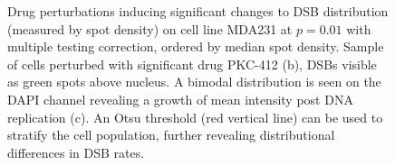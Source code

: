 \begin{figure}[h!]%
    \centering
    \qquad
    \qquad
  \caption{Drug perturbations inducing significant changes to DSB distribution (measured by spot density) on cell line MDA231 at $p = 0.01$ with multiple testing correction, ordered by median spot density. Sample of cells perturbed with significant drug PKC-412 (b), DSBs visible as green spots above nucleus. A bimodal distribution is seen on the DAPI channel revealing a growth of mean intensity post DNA replication (c). An Otsu threshold (red vertical line) can be used to stratify the cell population, further revealing distributional differences in DSB rates.}
\label{fig:dsb_figure}
\end{figure}

